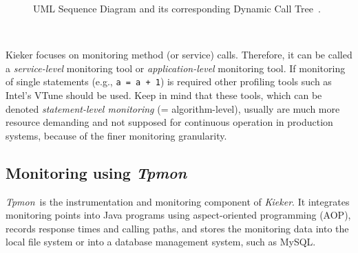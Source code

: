 \documentclass[a4paper,12pt]{scrartcl}
\newcommand{\tpmon}{\textit{Tpmon}}
\newcommand{\kieker}{\textit{Kieker}}
\begin{document}
\begin{figure}
\centering
{}
\hspace{1cm}
\caption{UML Sequence Diagram and its corresponding Dynamic Call Tree~\citep{RohrVanHoornGieseckeMatevskaHasselbring08TraceContextSensitivePerformanceModelsFromMonitoringDataOfSoftwareSystems}.
}\label{visualizationExample1}
\end{figure}

\

Kieker focuses on monitoring method (or service) calls. Therefore, it can be called a \textit{service-level} monitoring tool or \textit{application-level} monitoring tool. If monitoring of single statements (e.g., \small \texttt{a = a + 1}\normalsize) is required other profiling tools such as Intel's VTune should be used. Keep in mind that these tools, which can be denoted \textit{statement-level monitoring} (= algorithm-level), usually are much more resource demanding and not supposed for continuous operation in production systems, because of the finer monitoring granularity.

\subsection{Monitoring using \tpmon}

\tpmon\ is the instrumentation and monitoring component of \kieker. It integrates monitoring points into Java programs using aspect-oriented programming (AOP), records response times and calling paths, and stores the monitoring data into the local file system or into a database management system, such as MySQL. 
\end{document}
